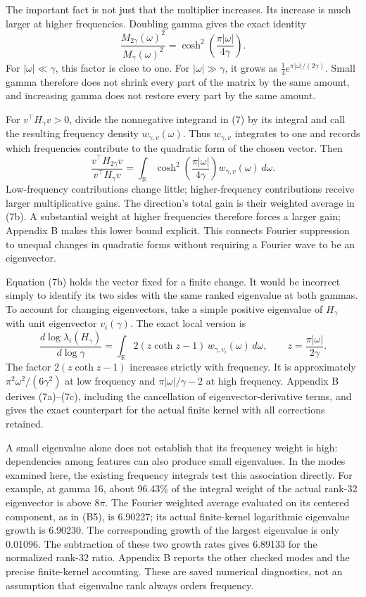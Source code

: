 \documentclass[11pt]{article}
\begin{document}
The important fact is not just that the multiplier increases. Its increase is much larger at higher frequencies. Doubling gamma gives the exact identity
\[
\boxed{\frac{M_{2\gamma}(\omega)^2}{M_\gamma(\omega)^2}
=\cosh^2\!\left(\frac{\pi|\omega|}{4\gamma}\right).}
\tag{7a}
\]
For \(|\omega|\ll\gamma\), this factor is close to one. For \(|\omega|\gg\gamma\), it grows as \(\tfrac14 e^{\pi|\omega|/(2\gamma)}\). Small gamma therefore does not shrink every part of the matrix by the same amount, and increasing gamma does not restore every part by the same amount.

For \(v^\top H_\gamma v>0\), divide the nonnegative integrand in (7) by its integral and call the resulting frequency density \(w_{\gamma,v}(\omega)\). Thus \(w_{\gamma,v}\) integrates to one and records which frequencies contribute to the quadratic form of the chosen vector. Then
\[
\boxed{\frac{v^\top H_{2\gamma}v}{v^\top H_\gamma v}
=\int_{\mathbb R}\cosh^2\!\left(\frac{\pi|\omega|}{4\gamma}\right)
 w_{\gamma,v}(\omega)\,d\omega.}
\tag{7b}
\]
Low-frequency contributions change little; higher-frequency contributions receive larger multiplicative gains. The direction's total gain is their weighted average in (7b). A substantial weight at higher frequencies therefore forces a larger gain; Appendix B makes this lower bound explicit. This connects Fourier suppression to unequal changes in quadratic forms without requiring a Fourier wave to be an eigenvector.

Equation (7b) holds the vector fixed for a finite change. It would be incorrect simply to identify its two sides with the same ranked eigenvalue at both gammas. To account for changing eigenvectors, take a simple positive eigenvalue of \(H_\gamma\) with unit eigenvector \(v_i(\gamma)\). The exact local version is
\[
\boxed{\frac{d\log\lambda_i(H_\gamma)}{d\log\gamma}
=\int_{\mathbb R}2(z\coth z-1)\,w_{\gamma,v_i}(\omega)\,d\omega,
\qquad z=\frac{\pi|\omega|}{2\gamma}.}
\tag{7c}
\]
The factor \(2(z\coth z-1)\) increases strictly with frequency. It is approximately \(\pi^2\omega^2/(6\gamma^2)\) at low frequency and \(\pi|\omega|/\gamma-2\) at high frequency. Appendix B derives (7a)--(7c), including the cancellation of eigenvector-derivative terms, and gives the exact counterpart for the actual finite kernel with all corrections retained.

A small eigenvalue alone does not establish that its frequency weight is high: dependencies among features can also produce small eigenvalues. In the modes examined here, the existing frequency integrals test this association directly. For example, at gamma 16, about 96.43\% of the integral weight of the actual rank-32 eigenvector is above \(8\pi\). The Fourier weighted average evaluated on its centered component, as in (B5), is 6.90227; its actual finite-kernel logarithmic eigenvalue growth is 6.90230. The corresponding growth of the largest eigenvalue is only 0.01096. The subtraction of these two growth rates gives 6.89133 for the normalized rank-32 ratio. Appendix B reports the other checked modes and the precise finite-kernel accounting. These are saved numerical diagnostics, not an assumption that eigenvalue rank always orders frequency.
\end{document}
